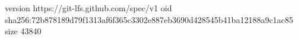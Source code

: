 version https://git-lfs.github.com/spec/v1
oid sha256:72b878189d79f1313af6f365c3302e887eb3690d428545b41ba12188a9c1ac85
size 43840
